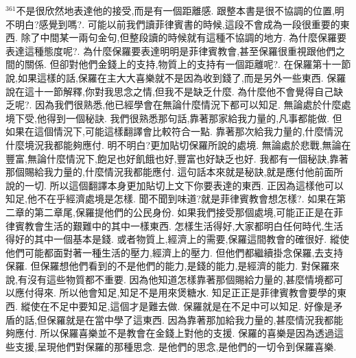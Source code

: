 \documentclass{book}
\begin{document}
$^{361}$不是很欣然地表達他的接受,而是有一個距離感.
跟整本書是很不協調的位置,明不明白?感覺到嗎?.
可能以前我們讀菲律賓書的時候,這段不會成為一段很重要的東西.
除了中間某一兩句金句,但整段讀的時候就有這種不協調的地方.
為什麼保羅要表達這種態度呢?.
為什麼保羅要表達明明是菲律賓教會,甚至保羅很重視跟他們之間的關係.
但卻對他們金錢上的支持,物質上的支持有一個距離呢?.
在保羅第十一節說,如果這樣的話,保羅在主大大喜樂就不是因為收到錢了,而是另外一些東西.
保羅說在這十一節解釋,你對我思念之情,但我不是缺乏什麼.
為什麼他不會覺得自己缺乏呢?.
因為我們很熟悉,他已經學會在無論什麼情況下都可以知足.
無論處於什麼處境下受,他得到一個秘訣.
我們很熟悉那句話,靠著那家給我力量的,凡事都能做.
但如果在這個情況下,可能這樣翻譯會比較符合一點.
靠著那次給我力量的,什麼情況什麼境況我都能夠應付.
明不明白?更加貼切保羅所說的處境.
無論處於悲戰,無論在豐富,無論什麼情況下,飽足也好飢餓也好,豐富也好缺乏也好.
我都有一個秘訣,靠著那個賜給我力量的,什麼情況我都能應付.
這句話本來就是秘訣,就是應付他前面所說的一切.
所以這個翻譯本身更加貼切上文下你要表達的東西.
正因為這樣他可以知足,他不在乎經濟處境是怎樣.
聞不聞到味道?就是菲律賓教會想怎樣?.
如果在第二章的第二章尾,保羅提他們的公民身份.
如果我們接受那個處境,可能正正是在菲律賓教會生活的艱難中的其中一樣東西.
怎樣生活得好,大家都明白任何時代,生活得好的其中一個基本是錢.
或者物質上,經濟上的需要,保羅這間教會的確很好.
縱使他們可能都面對著一種生活的壓力,經濟上的壓力.
但他們都繼續掛念保羅,去支持保羅.
但保羅想他們看到的不是他們的能力,是錢的能力,是經濟的能力.
對保羅來說,有沒有這些物質都不重要.
因為他知道怎樣靠著那個賜給力量的,甚麼情境都可以應付得來.
所以他會知足,知足不是用來煲糖水.
知足正正是菲律賓教會要學的東西.
縱使在不足中要知足,這個才是難去做.
保羅就是在不足中可以知足.
好像是矛盾的話,但保羅就是在當中學了這東西.
因為靠著那加給我力量的,甚麼情況我都能夠應付.
所以保羅喜樂並不是教會在金錢上對他的支援.
保羅的喜樂是因為透過這些支援,呈現他們對保羅的那種思念.
是他們的思念,是他們的一切令到保羅喜樂.
\end{document}
